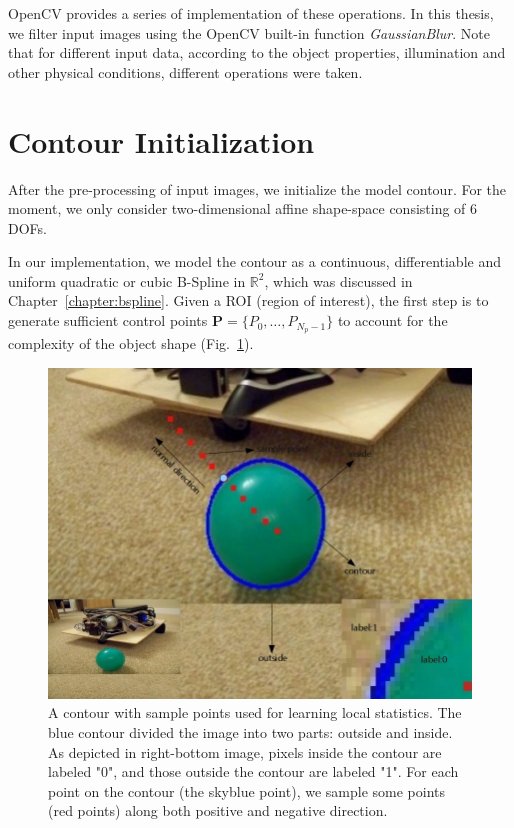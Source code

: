 OpenCV provides a series of implementation of these operations. In
this thesis, we filter input images using the OpenCV built-in function
\textit{GaussianBlur}. Note
that for different input data, according to the object properties,
illumination and other physical conditions, different operations
were taken. 

\section{Contour Initialization}
\label{sec:mp}

After the pre-processing of input images,  we initialize the model contour. For the moment, we only consider two-dimensional
affine shape-space consisting of 6 DOFs. %

In our implementation, we model the
contour as a continuous, differentiable and uniform quadratic or cubic
B-Spline in $\mathbb{R}^2$, which was discussed in Chapter~\ref{chapter:bspline}. 
Given a ROI (region of interest), the first step is to generate
sufficient control points $\mathbf{P} = \{P_0, \ldots, P_{N_p-1}\}$ to
account for the complexity of the object shape (Fig.~\ref{fig:prior}).

\begin{figure}[htb]
  \centering
  \includegraphics[width=\linewidth]{images/cont.jpg}
\caption[An contour with sample points used for learning local
statistics]{A contour with sample points used for learning local statistics. The blue contour
  divided the image into two parts: outside and inside. As depicted in
  right-bottom image, pixels inside the contour are labeled "0",
  and those outside the contour are labeled "1". For each point on the
  contour (the skyblue point), we sample some points (red points) along both positive
  and negative direction.}
\label{fig:prior}
\end{figure}

